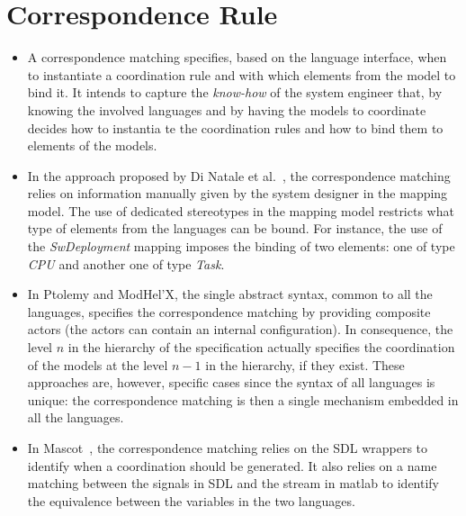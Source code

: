 \section{Correspondence Rule}
		\begin{itemize}
			\item A correspondence matching specifies, based on the language interface, when to instantiate a coordination rule and with which elements from the model to bind it.
			It intends to capture the \emph{know-how} of the system engineer that, by knowing the involved languages and by having the models to coordinate decides how to instantia           te the coordination rules and how to bind them to elements of the models.
			
			\item In the approach proposed by Di Natale et al.~\cite{dinatale}, the correspondence matching relies on information manually given by the system designer in the mapping model. The use of dedicated stereotypes in the mapping model restricts what type of elements from the languages can be bound. For instance, the use of the \emph{SwDeployment} mapping imposes the binding of two elements: one of type \emph{CPU} and another one of type \emph{Task}. 			
			\item In Ptolemy and ModHel'X, the single abstract syntax, common to all the languages, specifies the correspondence matching by providing composite actors (\ie the actors can contain an internal configuration). In consequence, the level $n$ in the hierarchy of the specification actually specifies the coordination of the models at the level $n-1$ in the hierarchy, if they exist. These approaches are, however, specific cases since the syntax of all languages is unique: the correspondence matching is then a single mechanism embedded in all the languages.
			
			\item In Mascot~\cite{mascotbib}, the correspondence matching relies on the SDL wrappers to identify when a coordination should be generated. It also relies on a name matching between the signals in SDL and the stream in matlab to identify the equivalence between the variables in the two languages. 
		\end{itemize}
